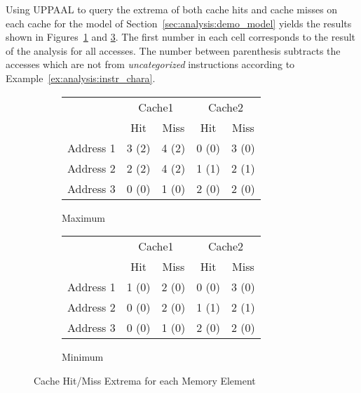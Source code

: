 \begin{example}
\label{ex:analysis:hit_miss}
Using UPPAAL to query the extrema of both cache hits and cache misses on each
cache for the model of Section~\ref{sec:analysis:demo_model} yields the results
shown in Figures~\ref{fig:analyzing:maximum_hit_miss} and
\ref{fig:analyzing:minimum_hit_miss}. The first number in each cell corresponds
to the result of the analysis for all accesses. The number between parenthesis
subtracts the accesses which are not from \textit{uncategorized} instructions
according to Example~\ref{ex:analysis:instr_chara}.

\begin{figure}[hbt!]
\begin{center}
\begin{subfigure}[t]{0.45\textwidth}
\centering
\begin{tabular}{|c|c|c|c|c|}
\cline{2-5}
\multicolumn{1}{c|}{} &
\multicolumn{2}{c|}{Cache1} &
\multicolumn{2}{c|}{Cache2} \\
\multicolumn{1}{c|}{} & Hit & Miss & Hit & Miss\\
\hline
Address 1 & 3 (2) & 4 (2) & 0 (0) & 3 (0)\\
\hline
Address 2 & 2 (2) & 4 (2) & 1 (1) & 2 (1)\\
\hline
Address 3 & 0 (0) & 1 (0) & 2 (0) & 2 (0)\\
\hline
\end{tabular}
\caption{Maximum}
\label{fig:analyzing:maximum_hit_miss}
\end{subfigure}
\begin{subfigure}[t]{0.45\textwidth}
\centering
\begin{tabular}{|c|c|c|c|c|}
\cline{2-5}
\multicolumn{1}{c|}{} &
\multicolumn{2}{c|}{Cache1} &
\multicolumn{2}{c|}{Cache2} \\
\multicolumn{1}{c|}{} & Hit & Miss & Hit & Miss\\
\hline
Address 1 & 1 (0) & 2 (0) & 0 (0) & 3 (0)\\
\hline
Address 2 & 0 (0) & 2 (0) & 1 (1) & 2 (1)\\
\hline
Address 3 & 0 (0) & 1 (0) & 2 (0) & 2 (0)\\
\hline
\end{tabular}
\caption{Minimum}
\label{fig:analyzing:minimum_hit_miss}
\end{subfigure}
\caption{Cache Hit/Miss Extrema for each Memory Element}
\end{center}
\end{figure}


\end{example}
